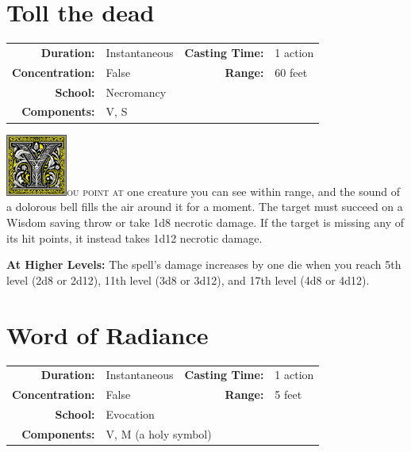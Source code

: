 \documentclass[12pt,showtrims]{memoir}
\begin{document}
\newpage
{}
\newpage
\section*{Toll the dead}
{
\small\centering\vspace{-6pt}
\begin{tabular}{rlrl}
\toprule

\textbf{Duration:} & Instantaneous  &
\textbf{Casting Time:} & 1 action \\
\textbf{Concentration:} & False &
\textbf{Range:} & 60 feet \\
\textbf{School:} & Necromancy \\
\textbf{Components:} & \multicolumn{3}{p{0.7\textwidth}}{V, S}\\

\bottomrule
\end{tabular}
}

\vspace{1\baselineskip}\noindent
\lettrine[lines=4]{\includegraphics[height=58pt]{initials/Y.png}}{ou point at} one creature you can see within range, and the sound of a dolorous bell fills the air around it for a moment. The target must succeed on a Wisdom saving throw or take 1d8 necrotic damage. If the target is missing any of its hit points, it instead takes 1d12 necrotic damage.

\vspace{8pt} \noindent\textbf{At Higher Levels:} The spell’s damage increases by one die when you reach 5th level (2d8 or 2d12), 11th level (3d8 or 3d12), and 17th level (4d8 or 4d12).
\newpage
\section*{Word of Radiance}
{
\small\centering\vspace{-6pt}
\begin{tabular}{rlrl}
\toprule

\textbf{Duration:} & Instantaneous &
\textbf{Casting Time:} & 1 action \\
\textbf{Concentration:} & False &
\textbf{Range:} & 5 feet \\
\textbf{School:} & Evocation \\
\textbf{Components:} & \multicolumn{3}{p{0.7\textwidth}}{V, M (a holy symbol)}\\

\bottomrule
\end{tabular}
}
\end{document}
